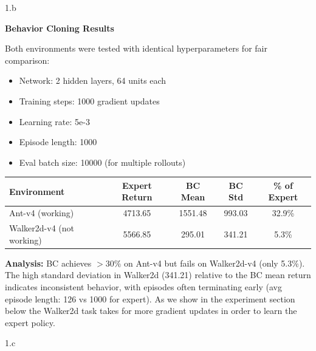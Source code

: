 \LARGE
1.b
\normalsize
\begin{answer}
  \textbf{Behavior Cloning Results}

  Both environments were tested with identical hyperparameters for fair comparison:
  \begin{itemize}
    \item Network: 2 hidden layers, 64 units each
    \item Training steps: 1000 gradient updates
    \item Learning rate: 5e-3
    \item Episode length: 1000
    \item Eval batch size: 10000 (for multiple rollouts)
  \end{itemize}

  \begin{center}
  \begin{tabular}{|l|c|c|c|c|}
    \hline
    \textbf{Environment} & \textbf{Expert Return} & \textbf{BC Mean} & \textbf{BC Std} & \textbf{\% of Expert} \\
    \hline
    Ant-v4 (working) & 4713.65 & 1551.48 & 993.03 & 32.9\% \\
    \hline
    Walker2d-v4 (not working) & 5566.85 & 295.01 & 341.21 & 5.3\% \\
    \hline
  \end{tabular}
  \end{center}

  \textbf{Analysis:} BC achieves $>$30\% on Ant-v4 but fails on Walker2d-v4 (only 5.3\%).
  The high standard deviation in Walker2d (341.21) relative to the BC mean return indicates inconsistent
  behavior, with episodes often terminating early (avg episode length: 126 vs 1000 for expert). As we show
  in the experiment section below the Walker2d task takes for more gradient updates in order to learn
  the expert policy.
\end{answer}
\clearpage

\LARGE
1.c
\normalsize

